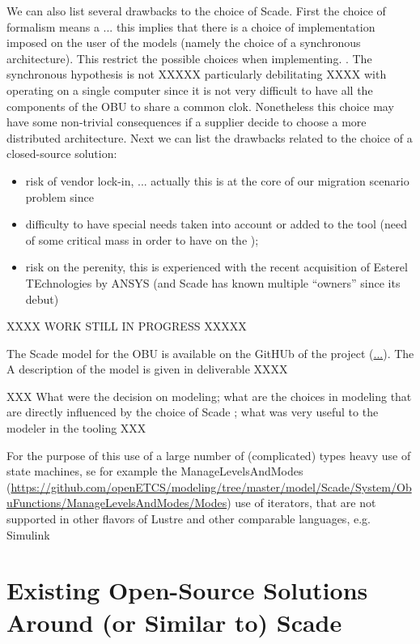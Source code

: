 \documentclass{template/openetcs_report}
\begin{document}
We can also list several drawbacks to the choice of Scade. First the
choice of formalism means a ... this implies that there is a choice of
implementation imposed on the user of the models (namely the choice of
a synchronous architecture). This restrict the possible choices when
implementing. . The synchronous hypothesis is not XXXXX particularly
debilitating XXXX with operating on a single computer since it is not
very difficult to have all the components of the OBU to share a common
clok. Nonetheless this choice may have some non-trivial consequences
if a supplier decide to choose a more distributed architecture. Next
we can list the drawbacks related to the choice of a closed-source
solution:
\begin{itemize}
\item risk of vendor lock-in, ... actually this is at the core of our migration scenario
  problem since
\item difficulty to have special needs taken into
  account or added to the tool (need of some critical mass in order
  to have on the ); 
\item risk on the perenity, this is experienced with the recent
  acquisition of Esterel TEchnologies by ANSYS (and Scade has known
  multiple ``owners'' since its debut)
\end{itemize}



XXXX WORK STILL IN PROGRESS XXXXX


The Scade model for the OBU is available on the GitHUb of the project
(\url{...}). The A description of the model is given in deliverable
XXXX


XXX What were the decision on modeling; what are the choices in modeling
that are directly influenced by the choice of Scade ; what was very
useful to the modeler in the tooling XXX

For the purpose of this 
use of a large number of (complicated) types heavy use of state
machines, se for example the ManageLevelsAndModes
(\url{https://github.com/openETCS/modeling/tree/master/model/Scade/System/ObuFunctions/ManageLevelsAndModes/Modes})
use of iterators, that are not supported in other flavors of Lustre
and other comparable languages, e.g. Simulink

\section{Existing Open-Source Solutions Around (or Similar to)
  Scade}
\end{document}
